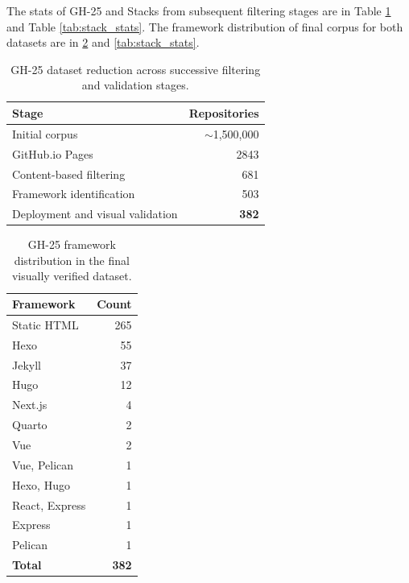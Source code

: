 The stats of GH-25 and Stacks from subsequent filtering stages are in Table \ref{tab:dataset_stats} and Table \ref{tab:stack_stats}. The framework distribution of final corpus for both datasets are in \ref{tab:framework_dist} and \ref{tab:stack_stats}.

\FloatBarrier

\begin{table}[htbp]
\centering
\begin{tabular}{l r}
\hline
\textbf{Stage} & \textbf{Repositories} \\
\hline
Initial corpus & $\sim$1,500,000 \\
GitHub.io Pages & 2843 \\
Content-based filtering & 681 \\
Framework identification & 503 \\
Deployment and visual validation & \textbf{382} \\
\hline
\end{tabular}
\caption{GH-25 dataset reduction across successive filtering and validation stages.}
\label{tab:dataset_stats}
\end{table}

\begin{table}[htbp]
\centering
\begin{tabular}{l r}
\hline
\textbf{Framework} & \textbf{Count} \\
\hline
Static HTML & 265 \\
Hexo & 55 \\
Jekyll & 37 \\
Hugo & 12 \\
Next.js & 4 \\
Quarto & 2 \\
Vue & 2 \\
Vue, Pelican & 1 \\
Hexo, Hugo & 1 \\
React, Express & 1 \\
Express & 1 \\
Pelican & 1 \\
\hline
\textbf{Total} & \textbf{382} \\
\hline
\end{tabular}
\caption{GH-25 framework distribution in the final visually verified dataset.}
\label{tab:framework_dist}
\end{table}

